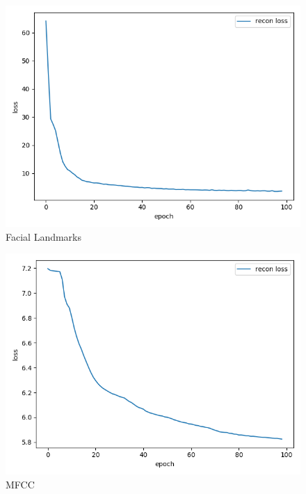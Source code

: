 \begin{figure}
    \centering
    \small
    \begin{minipage}[c]{0.31\linewidth}
    \centering
    \includegraphics[width=\textwidth]{images/results/unimodal_landmark_hidden040_batch1024_epoch100_noise02.png} \\
    Facial Landmarks
    \end{minipage}
    \begin{minipage}[c]{0.31\linewidth}
    \centering
    \includegraphics[width=\textwidth]{images/results/unimodal_mfcc_hidden040_batch1024_epoch100_noise01.png} \\
    MFCC
    \end{minipage}
    \begin{minipage}[c]{0.31\linewidth}

\end{minipage}
\end{figure}
